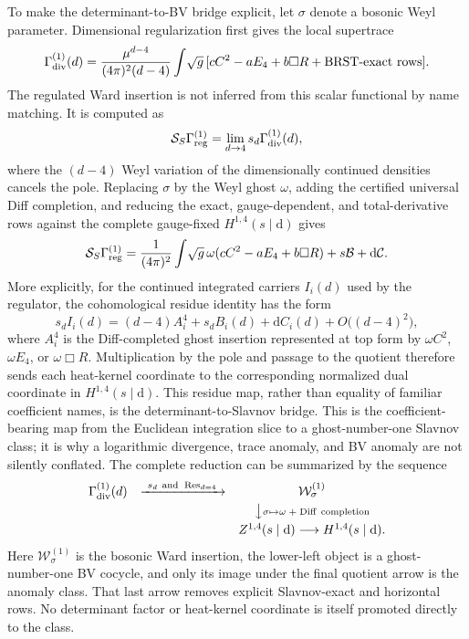 \documentclass[11pt]{article}
\theoremstyle{definition}
\theoremstyle{remark}
\newcommand{\dd}{\mathrm d}
\begin{document}
To make the determinant-to-BV bridge explicit, let $\sigma$ denote a bosonic
Weyl parameter.  Dimensional regularization first gives the local supertrace
\[
 \Gamma^{(1)}_{\rm div}(d)
 =\frac{\mu^{d-4}}{(4\pi)^2(d-4)}
 \int\!\sqrt g\,[cC^2-aE_4+b\Box R+\text{BRST-exact rows}].
\]
The regulated Ward insertion is not inferred from this scalar functional by
name matching.  It is computed as
\[
 \mathcal S_S\Gamma^{(1)}_{\rm reg}
 =\lim_{d\to4}s_d\Gamma^{(1)}_{\rm div}(d),
 \]
where the $(d-4)$ Weyl variation of the dimensionally continued densities
cancels the pole.  Replacing $\sigma$ by the Weyl ghost $\omega$, adding the
certified universal Diff completion, and reducing the exact, gauge-dependent,
and total-derivative rows against the complete gauge-fixed $H^{1,4}(s\mid\dd)$
gives
\[
 \mathcal S_S\Gamma^{(1)}_{\rm reg}
 =\frac1{(4\pi)^2}\int\!\sqrt g\,\omega
 (cC^2-aE_4+b\Box R)+s\mathcal B+\dd\mathcal C.
\]
More explicitly, for the continued integrated carriers $I_i(d)$ used by the
regulator, the cohomological residue identity has the form
\[
 s_d I_i(d)=(d-4)A_i^4+s_d B_i(d)+\dd C_i(d)
             +O\bigl((d-4)^2\bigr),
\]
where $A_i^4$ is the Diff-completed ghost insertion represented at top form
by $\omega C^2$, $\omega E_4$, or $\omega\Box R$.  Multiplication by the pole
and passage to the quotient therefore sends each heat-kernel coordinate to
the corresponding normalized dual coordinate in $H^{1,4}(s\mid\dd)$.  This
residue map, rather than equality of familiar coefficient names, is the
determinant-to-Slavnov bridge.
This is the coefficient-bearing map from the Euclidean integration slice to a
ghost-number-one Slavnov class; it is why a logarithmic divergence, trace
anomaly, and BV anomaly are not silently conflated.
The complete reduction can be summarized by the sequence
\[
 \begin{array}{ccc}
 \Gamma^{(1)}_{\rm div}(d)&\xrightarrow{\ s_d\ {\rm and}\
 \operatorname{Res}_{d=4}\ }&\mathcal W^{(1)}_\sigma\\[1mm]
 &&\big\downarrow\scriptstyle{\sigma\mapsto\omega\;{+}\;{\rm Diff\ completion}}\\[1mm]
 &&Z^{1,4}(s\mid\dd)\longrightarrow H^{1,4}(s\mid\dd).
 \end{array}
\]
Here $\mathcal W^{(1)}_\sigma$ is the bosonic Ward insertion, the lower-left
object is a ghost-number-one BV cocycle, and only its image under the final
quotient arrow is the anomaly class.  That last arrow removes explicit
Slavnov-exact and horizontal rows.  No determinant factor or heat-kernel
coordinate is itself promoted directly to the class.
\end{document}
